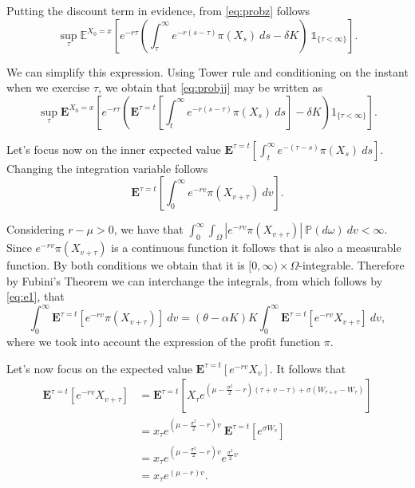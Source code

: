 Putting the discount term in evidence, from \eqref{eq:probz} follows
\begin{equation}
\sup_\tau \mathds{E}^{X_0=x} \left[e^{-r\tau }\left( \int_\tau^\infty e^{-r(s-\tau)} \pi(X_s)\ ds -\delta K \right) \ \mathds{1}_{\{\tau<\infty\}} \right].
\label{probjj}
\end{equation}

We can simplify this expression. Using Tower rule and conditioning on the instant when we exercise $\tau$, we obtain that \eqref{eq:probjj} may be written as
\begin{equation}
\sup_\tau \textbf{E}^{X_0=x}\left[ e^{- r\tau} \left( \textbf{E}^{\tau=t}\left[  \int_t^\infty e^{-r(s-\tau) }\pi(X_s)\ ds  \right] -\delta K\right) 1_{\{\tau<\infty\}} \right].
\label{eq:probm}
\end{equation}

Let's focus now on the inner expected value $\textbf{E}^{\tau=t}\left[  \int_t^\infty e^{-(\tau-s) }\pi(X_s) \ ds  \right]$. Changing the integration variable follows
\begin{equation}
\textbf{E}^{\tau=t}\left[  \int_0^\infty e^{-rv }\pi(X_{v+\tau})\ dv  \right].
\label{eq:e1}
\end{equation}

Considering $r-\mu>0$, we have that $ \int_0^\infty \int_\Omega    |e^{-rv }\pi(X_{v+\tau})| \ \mathds{P}(d \omega) \ dv < \infty$. Since $e^{-rv }\pi(X_{v+\tau})$ is a continuous function it follows that is also a measurable function. By both conditions we obtain that it is $[0,\infty) \times \Omega$-integrable. Therefore by Fubini's Theorem we can interchange the integrals, from which follows by \eqref{eq:e1}, that
\begin{equation}
\int_0^\infty\textbf{E}^{\tau=t}\left[   e^{-rv }\pi(X_{v+\tau}) \right]\ dv
= (\theta-\alpha K)K \int_0^\infty\textbf{E}^{\tau=t}\left[   e^{-rv } X_{v+\tau} \right]\ dv,
\label{eq:e2}
\end{equation}
where we took into account the expression of the profit function $\pi$.


Let's now focus on the expected value $\textbf{E}^{\tau=t}\left[   e^{-rv }  X_{v} \right]$.
It follows that
\begin{align}
\textbf{E}^{\tau=t}\left[   e^{-rv } X_{v+\tau} \right] 
&= \textbf{E}^{\tau=t}\left[   X_\tau e^{\left(\mu- \frac{\sigma^2}{2}-r \right) (\tau+v-\tau) + \sigma (W_{\tau+v}-W_\tau)}\right] \nonumber \\
&=x_\tau e^{\left(\mu- \frac{\sigma^2}{2}-r \right) v} \ \textbf{E}^{\tau=t}\left[ e^{\sigma W_v} \right] \nonumber \\
&= x_\tau e^{\left(\mu- \frac{\sigma^2}{2}-r \right) v} e^{ \frac{\sigma^2}{2} v} \nonumber \\
&=x_\tau e^{(\mu-r)v}.
\label{eq:e4}
\end{align}


